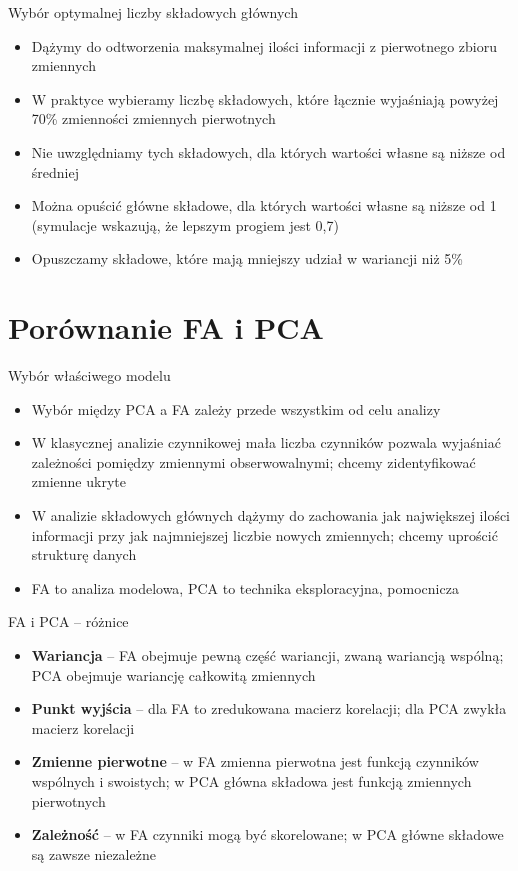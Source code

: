 \documentclass{beamer}
\begin{document}
\begin{frame}{Wybór optymalnej liczby składowych głównych}
  \begin{itemize}
  \item Dążymy do odtworzenia maksymalnej ilości informacji z pierwotnego zbioru zmiennych
  \item W praktyce wybieramy liczbę składowych, które łącznie wyjaśniają powyżej 70\% zmienności zmiennych pierwotnych
  \item Nie uwzględniamy tych składowych, dla których wartości własne są niższe od średniej
  \item Można opuścić główne składowe, dla których wartości własne są niższe od 1 (symulacje wskazują, że lepszym progiem jest 0,7)
  \item Opuszczamy składowe, które mają mniejszy udział w wariancji niż 5\%
   \end{itemize}
\end{frame}

\section{Porównanie FA i PCA}
\begin{frame}{Wybór właściwego modelu}
  \begin{itemize}
  \item Wybór między PCA a FA zależy przede wszystkim od celu analizy
  \item W klasycznej analizie czynnikowej mała liczba czynników pozwala wyjaśniać zależności pomiędzy zmiennymi obserwowalnymi; chcemy zidentyfikować zmienne ukryte
  \item W analizie składowych głównych dążymy do zachowania jak największej ilości informacji przy jak najmniejszej liczbie nowych zmiennych; chcemy uprościć strukturę danych
  \item FA to analiza modelowa, PCA to technika eksploracyjna, pomocnicza
  \end{itemize}
\end{frame}

\begin{frame}{FA i PCA -- różnice}
  \begin{itemize}
  \item \textbf{Wariancja} -- FA obejmuje pewną część wariancji, zwaną wariancją wspólną; PCA obejmuje wariancję całkowitą zmiennych
  \item \textbf{Punkt wyjścia} -- dla FA to zredukowana macierz korelacji; dla PCA zwykła macierz korelacji
  \item \textbf{Zmienne pierwotne} -- w FA zmienna pierwotna jest funkcją czynników wspólnych i swoistych; w PCA główna składowa jest funkcją zmiennych pierwotnych
  \item \textbf{Zależność} -- w FA czynniki mogą być skorelowane; w PCA główne składowe są zawsze niezależne
   \end{itemize}
\end{frame}
\end{document}
